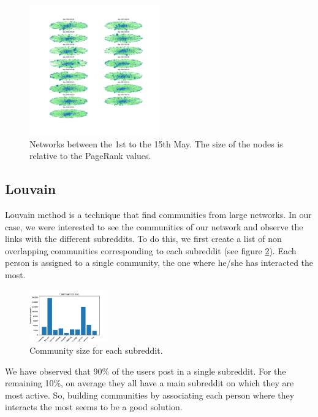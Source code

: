 \begin{figure}[H]
    \centering
    \includegraphics[width=0.5\textwidth]{figures/rank_days.pdf}
    \caption{Networks between the 1st to the 15th May. The size of the nodes is relative to the PageRank values.}
    \label{fig:rankdays}
\end{figure}

\subsection{Louvain}
Louvain method is a technique that find communities from large networks. In our case, we were interested to see the communities of our network and observe the links with the different subreddits. To do this, we first create a list of non overlapping communities corresponding to each subreddit (see figure \ref{fig:communitiessize}). Each person is assigned to a single community, the one where he/she has interacted the most.

\begin{figure}[H]
    \centering
    \includegraphics[width=0.3\textwidth]{figures/communities_size.pdf}
    \caption{Community size for each subreddit.}
    \label{fig:communitiessize}
\end{figure}

We have observed that 90\% of the users post in a single subreddit. For the remaining 10\%, on average they all have a main subreddit on which they are most active. So, building communities by associating each person where they interacts the most seems to be a good solution. 


